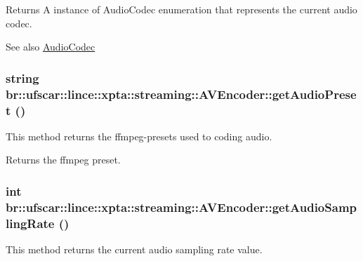 \begin{DoxyReturn}{Returns}
A instance of AudioCodec enumeration that represents the current audio codec. 
\end{DoxyReturn}
\begin{DoxySeeAlso}{See also}
\hyperlink{namespacebr_1_1ufscar_1_1lince_1_1xpta_1_1streaming_afc25fb5f7c0f63197ec25d8d9de19b01}{AudioCodec} 
\end{DoxySeeAlso}
\hypertarget{classbr_1_1ufscar_1_1lince_1_1xpta_1_1streaming_1_1AVEncoder_a70813888818b9827e95f3fc19facf2b4}{
\subsubsection[{getAudioPreset}]{\setlength{\rightskip}{0pt plus 5cm}string br::ufscar::lince::xpta::streaming::AVEncoder::getAudioPreset ()}}
\label{classbr_1_1ufscar_1_1lince_1_1xpta_1_1streaming_1_1AVEncoder_a70813888818b9827e95f3fc19facf2b4}


This method returns the ffmpeg-\/presets used to coding audio. 

\begin{DoxyReturn}{Returns}
the ffmpeg preset. 
\end{DoxyReturn}
\hypertarget{classbr_1_1ufscar_1_1lince_1_1xpta_1_1streaming_1_1AVEncoder_a345a87d86daa1c1973f5b55949c00954}{
\subsubsection[{getAudioSamplingRate}]{\setlength{\rightskip}{0pt plus 5cm}int br::ufscar::lince::xpta::streaming::AVEncoder::getAudioSamplingRate ()}}
\label{classbr_1_1ufscar_1_1lince_1_1xpta_1_1streaming_1_1AVEncoder_a345a87d86daa1c1973f5b55949c00954}


This method returns the current audio sampling rate value. 

